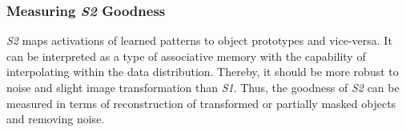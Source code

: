 




\subsubsection{Measuring \emph{S2} Goodness}
\emph{S2} maps activations of learned patterns to object prototypes and vice-versa.
It can be interpreted as a type of associative memory with the capability of interpolating within the data distribution.
Thereby, it should be more robust to noise and slight image transformation than \emph{S1}.
Thus, the goodness of \emph{S2} can be measured in terms of reconstruction of transformed or partially masked objects and removing noise.


